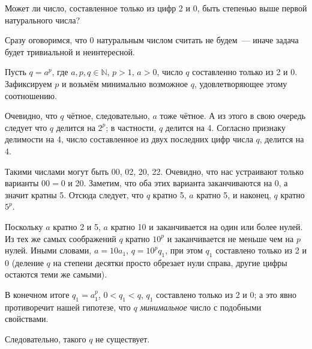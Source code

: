 \documentclass[12pt, a4paper]{article}
\begin{document}
Может ли число, составленное только из цифр 2 и 0, быть степенью выше первой натурального числа?

Сразу оговоримся, что 0 натуральным числом считать не будем~--- иначе задача будет тривиальной и неинтересной.

Пусть $q = a^p$, где $a,p,q\in \mathbb{N}$, $p > 1$, $a > 0$, число $q$ составленно только из 2 и 0.
Зафиксируем $p$ и возьмём минимально возможное $q$, удовлетворяющее этому соотношению.

Очевидно, что $q$ чётное, следовательно, $a$ тоже чётное.
А из этого в свою очередь следует что $q$ делится на $2^p$; в частности, $q$ делится на 4.
Согласно признаку делимости на 4, число составленное из двух последних цифр числа $q$, делится на 4.

Такими числами могут быть 00, 02, 20, 22. Очевидно, что нас устраивают только варианты $00=0$ и 20.
Заметим, что оба этих варианта заканчиваются на 0, а значит кратны 5.
Отсюда следует, что $q$ кратно 5, $a$ кратно 5, и наконец, $q$ кратно $5^p$.

Поскольку $a$ кратно 2 и 5, $a$ кратно 10 и заканчивается на один или более нулей.
Из тех же самых соображений $q$ кратно $10^p$ и заканчивается не меньше чем на $p$ нулей.
Иными словами, $a=10a_1$, $q=10^pq_1$, при этом $q_1$ составлено только из 2 и 0
(деление $q$ на степени десятки просто обрезает нули справа, другие цифры остаются теми же самыми).

В конечном итоге $q_1=a_1^p$, $0 < q_1 < q$, $q_1$ составлено только из 2 и 0;
а это явно противоречит нашей гипотезе, что $q$ \textit{минимальное} число с подобными свойствами.

Следовательно, такого $q$ не существует.
\end{document}
